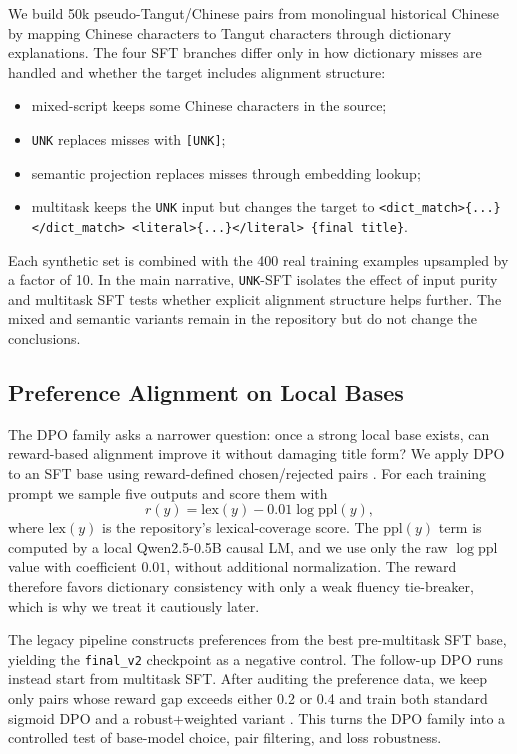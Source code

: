 We build 50k pseudo-Tangut/Chinese pairs from monolingual historical Chinese by mapping Chinese characters to Tangut characters through dictionary explanations. The four SFT branches differ only in how dictionary misses are handled and whether the target includes alignment structure:
\begin{itemize}
\item mixed-script keeps some Chinese characters in the source;
\item \texttt{UNK} replaces misses with \texttt{[UNK]};
\item semantic projection replaces misses through embedding lookup;
\item multitask keeps the \texttt{UNK} input but changes the target to \texttt{<dict\_match>\{...\}</dict\_match> <literal>\{...\}</literal> \{final title\}}.
\end{itemize}

Each synthetic set is combined with the 400 real training examples upsampled by a factor of 10. In the main narrative, \texttt{UNK}-SFT isolates the effect of input purity and multitask SFT tests whether explicit alignment structure helps further. The mixed and semantic variants remain in the repository but do not change the conclusions.

\subsection{Preference Alignment on Local Bases}

The DPO family asks a narrower question: once a strong local base exists, can reward-based alignment improve it without damaging title form? We apply DPO to an SFT base using reward-defined chosen/rejected pairs \cite{rafailov2023dpo}. For each training prompt we sample five outputs and score them with
\[
r(y) = \mathrm{lex}(y) - 0.01 \log \mathrm{ppl}(y),
\]
where $\mathrm{lex}(y)$ is the repository's lexical-coverage score. The $\mathrm{ppl}(y)$ term is computed by a local Qwen2.5-0.5B causal LM, and we use only the raw $\log \mathrm{ppl}$ value with coefficient $0.01$, without additional normalization. The reward therefore favors dictionary consistency with only a weak fluency tie-breaker, which is why we treat it cautiously later.

The legacy pipeline constructs preferences from the best pre-multitask SFT base, yielding the \texttt{final\_v2} checkpoint as a negative control. The follow-up DPO runs instead start from multitask SFT. After auditing the preference data, we keep only pairs whose reward gap exceeds either 0.2 or 0.4 and train both standard sigmoid DPO and a robust+weighted variant \cite{chowdhury2024robustdpo,zhou2024wpo}. This turns the DPO family into a controlled test of base-model choice, pair filtering, and loss robustness.


